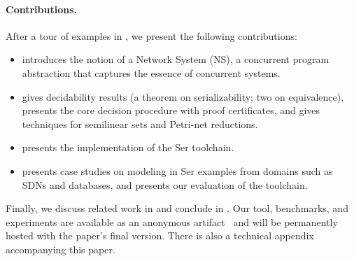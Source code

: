 \paragraph{Contributions.}
After a tour of examples in , we present the following contributions:
\begin{itemize}
    \item {} introduces the notion of a Network System (NS), a concurrent program abstraction that captures the essence of concurrent systems.
    \item {} gives decidability results (a theorem on serializability; two on equivalence), presents the core decision procedure with proof certificates, and gives techniques for semilinear sets and Petri-net reductions.
    \item {} presents the implementation of the Ser toolchain.
    \item {} presents case studies on modeling in Ser examples from domains such as SDNs and databases, and presents our evaluation of the toolchain.
\end{itemize}


Finally, we discuss related work in  and conclude in .
Our tool, benchmarks, and experiments are available as an anonymous artifact~\cite{ArtifactRepository} and will be permanently hosted with the paper’s final version. There is also a technical appendix accompanying this paper.